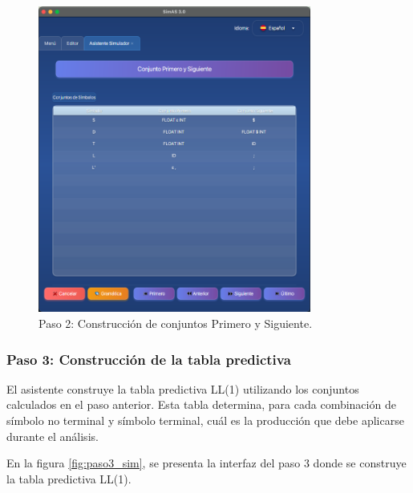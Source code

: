 \needspace{6cm}
\begin{figure}[H]
\centering
\includegraphics[width=0.8\textwidth]{figuras2/simulador/paso2_conjuntos.png}
\caption{Paso 2: Construcción de conjuntos Primero y Siguiente.}
\label{fig:paso2_sim}
\end{figure}

\subsubsection{Paso 3: Construcción de la tabla predictiva}

El asistente construye la tabla predictiva LL(1) utilizando los conjuntos calculados en el paso anterior. Esta tabla determina, para cada combinación de símbolo no terminal y símbolo terminal, cuál es la producción que debe aplicarse durante el análisis.

En la figura \ref{fig:paso3_sim}, se presenta la interfaz del paso 3 donde se construye la tabla predictiva LL(1).

